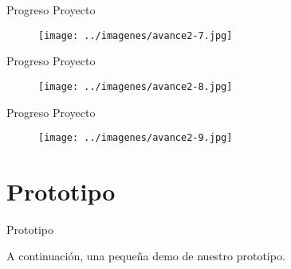 \documentclass{beamer}
\begin{document}
\begin{frame}{Progreso Proyecto}

\begin{figure}
\centering
\texttt{[image: ../imagenes/avance2-7.jpg]}
\end{figure}

\end{frame}

\begin{frame}{Progreso Proyecto}

\begin{figure}
\centering
\texttt{[image: ../imagenes/avance2-8.jpg]}
\end{figure}

\end{frame}

\begin{frame}{Progreso Proyecto}

\begin{figure}
\centering
\texttt{[image: ../imagenes/avance2-9.jpg]}
\end{figure}

\end{frame}


\section{Prototipo}

\begin{frame}{Prototipo}

A continuación, una pequeña demo de nuestro prototipo.

\end{frame}
\end{document}
